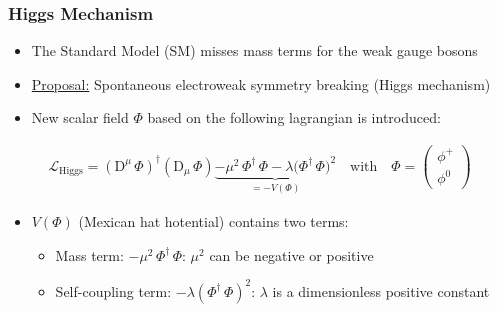 \documentclass[xcolor={usenames,dvipsnames,svgnames,table}]{beamer}
\begin{document}
\begin{frame}
 \titlepage
\end{frame}


\begin{frame}
    \frametitle{Higgs Mechanism}
    \begin{itemize}
        \item The Standard Model (SM) misses mass terms for the weak gauge bosons
        \item \underline{Proposal:} Spontaneous electroweak symmetry breaking (Higgs mechanism)
        \item New scalar field $\Phi$ based on the following lagrangian is introduced:
    \end{itemize}
    \begin{gather*}
        \label{eq_lagrangian_higgs}
        \mathcal{L}_\mathrm{Higgs} = (\mathrm{D}\xspace^\mu \, \Phi)^\dagger (\mathrm{D}\xspace_\mu \, \Phi) \underbrace{- \mu^2 \, \Phi^\dagger \, \Phi - \lambda {(\Phi^\dagger \, \Phi})^2}_{=-V(\Phi)} \quad \text{with} \quad \Phi =  \begin{pmatrix} \phi^+ \\ \phi^0 \end{pmatrix}
    \end{gather*}
    \begin{itemize}
        \item $V(\Phi)$ (Mexican hat hotential) contains two terms:
        \begin{itemize}
            \item Mass term: $- \mu^2 \, \Phi^\dagger \, \Phi $: $\mu^2$ can be negative or positive
            \item Self-coupling term: $- \lambda (\Phi^\dagger \, \Phi)^2$: $\lambda$ is a dimensionless positive constant
        \end{itemize}
    \end{itemize}
\end{frame}
\end{document}
